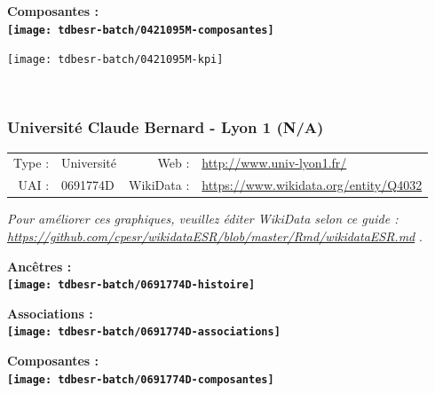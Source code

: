 \documentclass[12pt,french,]{article}
\begin{document}
\hrulefill

\begin{center} \bf Composantes : \\  
\texttt{[image: tdbesr-batch/0421095M-composantes]} \end{center}

\begin{center}\texttt{[image: tdbesr-batch/0421095M-kpi]} \end{center}\checkoddpage

\ifoddpage \fi ~\newpage  

\hypertarget{universituxe9-claude-bernard---lyon-1-na}{%
\subsubsection{Université Claude Bernard - Lyon 1
(N/A)}\label{universituxe9-claude-bernard---lyon-1-na}}

\begin{tabular*}{\textwidth}{rp{5cm}rl}  
\hline  
Type : & Université & Web : &\href{http://www.univ-lyon1.fr/}{http://www.univ-lyon1.fr/} \\  
UAI : & 0691774D & WikiData : & \href{https://www.wikidata.org/entity/Q4032}{https://www.wikidata.org/entity/Q4032} \\  
\hline  
\end{tabular*}

\textit{\scriptsize Pour améliorer ces graphiques, veuillez éditer WikiData selon ce guide :  \href{https://github.com/cpesr/wikidataESR/blob/master/Rmd/wikidataESR.md}{https://github.com/cpesr/wikidataESR/blob/master/Rmd/wikidataESR.md}}
.

\vspace{1cm}  
\begin{minipage}[b]{0.50\textwidth}\begin{center} \bf Ancêtres : \\  
\texttt{[image: tdbesr-batch/0691774D-histoire]} \end{center}\end{minipage}\begin{minipage}[b]{0.50\textwidth}\begin{center} \bf Associations : \\  
\texttt{[image: tdbesr-batch/0691774D-associations]} \end{center}\end{minipage}

\hrulefill

\begin{center} \bf Composantes : \\  
\texttt{[image: tdbesr-batch/0691774D-composantes]} \end{center}
\end{document}

